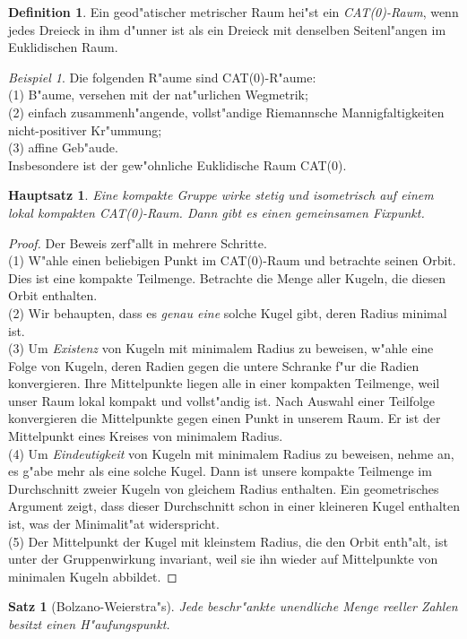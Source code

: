 \documentclass{article}
\theoremstyle{plain}
\newtheorem{theorem}[equation]{Hauptsatz}
\newtheorem*{theo}{Satz}
\theoremstyle{definition}
\newtheorem{definition}[equation]{Definition}
\theoremstyle{remark}
\newtheorem{example}[equation]{Beispiel}
\begin{document}
\begin{definition}
Ein geod"atischer metrischer Raum hei"st ein \emph{CAT(0)-Raum}, wenn
jedes Dreieck in ihm d"unner ist als ein Dreieck mit denselben Seitenl"angen im
Euklidischen Raum.
\end{definition}

\begin{example}
Die folgenden R"aume sind CAT(0)-R"aume:\\
(1) B"aume, versehen mit der nat"urlichen Wegmetrik;\\
(2) einfach zusammenh"angende, vollst"andige Riemannsche Mannigfaltigkeiten
nicht-positiver Kr"ummung;\\
(3) affine Geb"aude.\\
Insbesondere ist der gew"ohnliche Euklidische Raum CAT(0).
\end{example}

\begin{theorem}
Eine kompakte Gruppe wirke stetig und isometrisch auf einem lokal
kompakten CAT(0)-Raum. Dann gibt es einen gemeinsamen Fixpunkt.
\end{theorem}

\begin{proof}
Der Beweis zerf"allt in mehrere Schritte.\\
(1) W"ahle einen beliebigen Punkt im CAT(0)-Raum und betrachte seinen Orbit.
Dies ist eine kompakte Teilmenge. Betrachte die Menge aller Kugeln,
die diesen Orbit enthalten.\\
(2) Wir behaupten, dass es \emph{genau eine} solche Kugel gibt, deren Radius minimal
ist.\\
(3) Um \emph{Existenz} von Kugeln mit minimalem Radius zu beweisen, w"ahle eine
Folge von Kugeln, deren Radien gegen die untere Schranke f"ur die Radien
konvergieren. Ihre Mittelpunkte liegen alle in einer kompakten Teilmenge,
weil unser Raum lokal kompakt und vollst"andig ist. Nach Auswahl einer
Teilfolge konvergieren die Mittelpunkte gegen einen Punkt in unserem
Raum. Er ist der Mittelpunkt eines Kreises von minimalem Radius.\\
(4) Um \emph{Eindeutigkeit} von Kugeln mit minimalem Radius zu beweisen, nehme
an, es g"abe mehr als eine solche Kugel. Dann ist unsere kompakte Teilmenge
im Durchschnitt zweier Kugeln von gleichem Radius enthalten. Ein geometrisches
Argument zeigt, dass dieser Durchschnitt schon in einer kleineren
Kugel enthalten ist, was der Minimalit"at widerspricht.\\
(5) Der Mittelpunkt der Kugel mit kleinstem Radius, die den Orbit enth"alt, ist
unter der Gruppenwirkung invariant, weil sie ihn wieder auf Mittelpunkte
von minimalen Kugeln abbildet. 
\end{proof}

\begin{theo}[Bolzano-Weierstra"s]
Jede beschr"ankte unendliche Menge reeller Zahlen besitzt einen H"aufungspunkt.
\end{theo}
\end{document}
